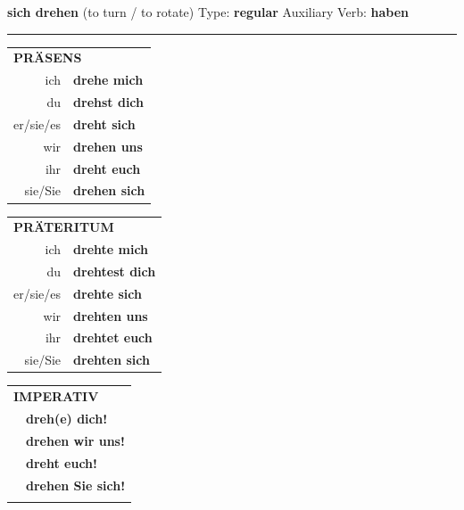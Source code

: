 \documentclass[10pt,a4paper]{revtex4-2}
\begin{document}
\begin{verbbox}
    {\Large \bf sich drehen} (to turn / to rotate) \hfill Type: \textbf{regular} \hfill Auxiliary Verb: \textbf{haben} 
    
     \vspace{5pt}

    \hrule
    
    \vspace{5pt}

  \begin{tabular}{rl}
     \multicolumn{2}{l}{\textbf{PRÄSENS} }\\
    ich & \textbf{drehe mich}\\
    du & \textbf{drehst dich}\\
    er/sie/es & \textbf{dreht sich}\\
    wir & \textbf{drehen uns}\\
    ihr & \textbf{dreht euch}\\
    sie/Sie & \textbf{drehen sich}\\
  \end{tabular}
  \hfill
     \begin{tabular}{rl}
    \multicolumn{2}{l}{\textbf{PRÄTERITUM} }\\
    ich & \textbf{drehte mich}\\
    du & \textbf{drehtest dich}\\
    er/sie/es & \textbf{drehte sich}\\
    wir & \textbf{drehten uns}\\
    ihr & \textbf{drehtet euch}\\
    sie/Sie & \textbf{drehten sich}\\
  \end{tabular}
  \hfill
  \begin{tabular}{rl}
     \multicolumn{2}{l}{\textbf{IMPERATIV} }\\
   & \textbf{dreh(e) dich!}\\
   & \textbf{drehen wir uns!}\\
   & \textbf{dreht euch!}\\
   & \textbf{drehen Sie sich!}\\
   & \vspace{10pt}
  \end{tabular}

    \vspace{10pt}


\end{verbbox}
\end{document}
